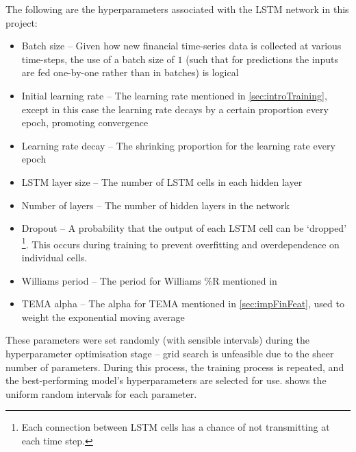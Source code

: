 \documentclass[12pt,a4paper,twoside,openright]{report}
\begin{document}
The following are the hyperparameters associated with the LSTM network in this project:

\begin{itemize}
\item
Batch size -- Given how new financial time-series data is collected at various
time-steps, the use of a batch size of $1$ (such that
for predictions the inputs are fed one-by-one rather than in batches) is logical

\item
Initial learning rate -- The learning rate mentioned in \cref{sec:introTraining},
except in this case the learning rate decays by a certain proportion every epoch, promoting convergence

\item
Learning rate decay -- The shrinking proportion for the learning rate every epoch

\item
LSTM layer size -- The number of LSTM cells in each hidden layer

\item
Number of layers -- The number of hidden layers in the network

\item
Dropout -- A probability that the output of each LSTM cell can be `dropped'
\footnote{Each connection between LSTM cells has a chance of not transmitting at each time step.}. 
This occurs during training to prevent overfitting and overdependence on individual cells.

\item
Williams period -- The period for Williams \%R mentioned in 

\item
TEMA alpha -- The alpha for TEMA mentioned in \cref{sec:impFinFeat}, used to weight
the exponential moving average
\end{itemize}

These parameters were set randomly (with sensible intervals) during the hyperparameter
optimisation stage -- grid search is unfeasible due to the sheer number 
of parameters. During this process, the training process is repeated,
and the best-performing
model's hyperparameters are selected for use.  shows the
uniform random intervals for each parameter.
\end{document}
